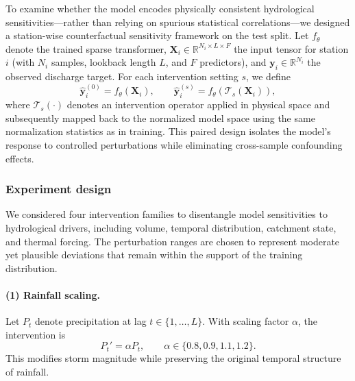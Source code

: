 \documentclass[11pt]{article}
\begin{document}
To examine whether the model encodes physically consistent hydrological sensitivities—rather than relying on spurious statistical correlations—we designed a station-wise counterfactual sensitivity framework on the test split\cite{simic2025perturbation}. Let $f_{\theta}$ denote the trained sparse transformer, $\mathbf{X}_{i}\in\mathbb{R}^{N_i\times L\times F}$ the input tensor for station $i$ (with $N_i$ samples, lookback length $L$, and $F$ predictors), and $\mathbf{y}_{i}\in\mathbb{R}^{N_i}$ the observed discharge target. For each intervention setting $s$, we define
\begin{equation}
    \hat{\mathbf{y}}_{i}^{(0)} = f_{\theta}(\mathbf{X}_{i}),
    \qquad
    \hat{\mathbf{y}}_{i}^{(s)} = f_{\theta}(\mathcal{T}_{s}(\mathbf{X}_{i})),
\end{equation}
where $\mathcal{T}_{s}(\cdot)$ denotes an intervention operator applied in physical space and subsequently mapped back to the normalized model space using the same normalization statistics as in training\cite{read2019process}. This paired design isolates the model’s response to controlled perturbations while eliminating cross-sample confounding effects\cite{10.2166/wcc.2017.149}.

\subsubsection*{Experiment design}

We considered four intervention families to disentangle model sensitivities to hydrological drivers, including volume, temporal distribution, catchment state, and thermal forcing\cite{hess-30-1077-2026}. The perturbation ranges are chosen to represent moderate yet plausible deviations that remain within the support of the training distribution.

\paragraph{(1) Rainfall scaling.}
Let $P_t$ denote precipitation at lag $t\in\{1,\dots,L\}$. With scaling factor $\alpha$, the intervention is
\begin{equation}
    P_t' = \alpha P_t,
    \qquad
    \alpha\in\{0.8,0.9,1.1,1.2\}.
\end{equation}
This modifies storm magnitude while preserving the original temporal structure of rainfall\cite{nearing2021role}.
\end{document}
